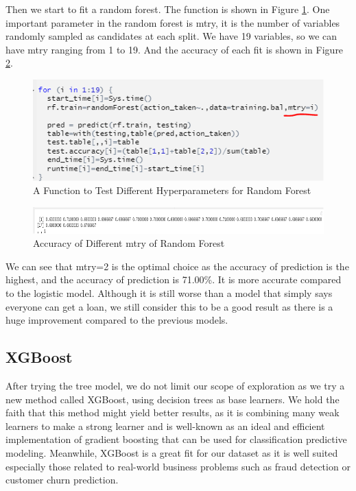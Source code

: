\documentclass{jpp}
\begin{document}
Then we start to fit a random forest. The function is shown in Figure \ref{rf_try}. One important parameter in the random forest is mtry, it is the number of variables randomly sampled as candidates at each split. We have 19 variables, so we can have mtry ranging from 1 to 19. And the accuracy of each fit is shown in Figure \ref{mtry_results}.

\begin{figure}
  \centering
  \includegraphics[width=.9\linewidth]{rf_try.png}  
  \caption{A Function to Test Different Hyperparameters for Random Forest}
\label{rf_try}
\end{figure}

\begin{figure}
  \centering
  \includegraphics[width=.9\linewidth]{mtry_results.png}  
  \caption{Accuracy of Different mtry of Random Forest}
\label{mtry_results}
\end{figure}


We can see that mtry=2 is the optimal choice as the accuracy of prediction is the highest, and the accuracy of prediction is 71.00\%. It is more accurate compared to the logistic model. Although it is still worse than a model that simply says everyone can get a loan, we still consider this to be a good result as there is a huge improvement compared to the previous models.


\subsection{XGBoost}

After trying the tree model, we do not limit our scope of exploration as we try a new method called XGBoost, using decision trees as base learners. We hold the faith that this method might yield better results, as it is combining many weak learners to make a strong learner and is well-known as an ideal and efficient implementation of gradient boosting that can be used for classification predictive modeling. Meanwhile, XGBoost is a great fit for our dataset as it is well suited especially those related to real-world business problems such as fraud detection or customer churn prediction.
\end{document}
